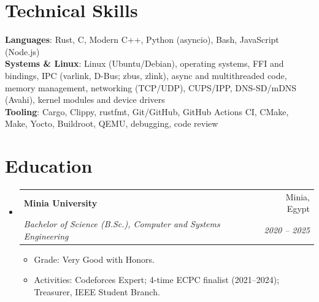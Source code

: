 \documentclass[letterpaper,11pt]{article}
\makeatletter
\newcommand{\resumeItem}[1]{
  \item\small{
    {#1 \vspace{-2pt}}
  }
}
\newcommand{\resumeSubheading}[4]{
  \vspace{-2pt}\item
    \begin{tabular*}{0.97\textwidth}[t]{l@{\extracolsep{\fill}}r}
      \textbf{#1} & #2 \\
      \textit{\small#3} & \textit{\small #4} \\
    \end{tabular*}\vspace{-7pt}
}
\newcommand{\resumeSubHeadingListStart}{\begin{itemize}[leftmargin=0.15in, label={}]}
\newcommand{\resumeSubHeadingListEnd}{\end{itemize}}
\newcommand{\resumeItemListStart}{\begin{itemize}}
\newcommand{\resumeItemListEnd}{\end{itemize}\vspace{-5pt}}
\makeatother
\begin{document}
%
\section{Technical Skills}
 \begin{itemize}[leftmargin=0.15in, label={}]
    \small{\item{
     \textbf{Languages}{: Rust, C, Modern C++, Python (asyncio), Bash, JavaScript (Node.js)} \\
     \textbf{Systems \& Linux}{: Linux (Ubuntu/Debian), operating systems, FFI and bindings, IPC (varlink, D-Bus; zbus, zlink), async and multithreaded code, memory management, networking (TCP/UDP), CUPS/IPP, DNS-SD/mDNS (Avahi), kernel modules and device drivers} \\
     \textbf{Tooling}{: Cargo, Clippy, rustfmt, Git/GitHub, GitHub Actions CI, CMake, Make, Yocto, Buildroot, QEMU, debugging, code review}
    }}
 \end{itemize}

\section{Education}
  \resumeSubHeadingListStart
    \resumeSubheading
      {Minia University}{Minia, Egypt}
      {Bachelor of Science (B.Sc.), Computer and Systems Engineering}{2020 -- 2025}
      \resumeItemListStart
        \resumeItem{Grade: Very Good with Honors.}
        \resumeItem{Activities: Codeforces Expert; 4-time ECPC finalist (2021--2024); Treasurer, IEEE Student Branch.}
      \resumeItemListEnd
  \resumeSubHeadingListEnd


\end{document}
